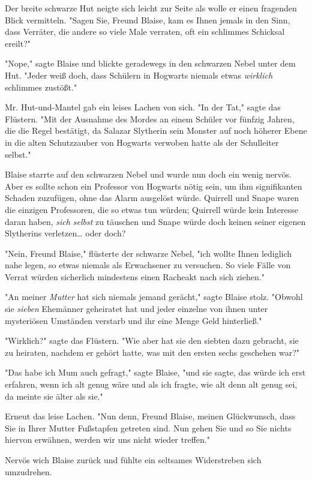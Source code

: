 {Der breite schwarze Hut neigte sich leicht zur Seite als wolle er einen fragenden Blick vermitteln. "Sagen Sie, Freund Blaise, kam es Ihnen jemals in den Sinn, dass Verräter, die andere so viele Male verraten, oft ein schlimmes Schicksal ereilt?"

"Nope," sagte Blaise und blickte geradewegs in den schwarzen Nebel unter dem Hut. "Jeder weiß doch, dass Schülern in Hogwarts niemals etwas \emph{wirklich} schlimmes zustößt."

Mr. Hut-und-Mantel gab ein leises Lachen von sich. "In der Tat," sagte das Flüstern. "Mit der Ausnahme des Mordes an einem Schüler vor fünfzig Jahren, die die Regel bestätigt, da Salazar Slytherin sein Monster auf noch höherer Ebene in die alten Schutzzauber von Hogwarts verwoben hatte als der Schulleiter selbst."

Blaise starrte auf den schwarzen Nebel und wurde nun doch ein wenig nervös. Aber es sollte schon ein Professor von Hogwarts nötig sein, um ihm signifikanten Schaden zuzufügen, ohne das Alarm ausgelöst würde. Quirrell und Snape waren die einzigen Professoren, die so etwas tun würden; Quirrell würde kein Interesse daran haben, \emph{sich selbst} zu täuschen und Snape würde doch keinen seiner eigenen Slytherins verletzen… oder doch?

"Nein, Freund Blaise," flüsterte der schwarze Nebel, "ich wollte Ihnen lediglich nahe legen, so etwas niemals als Erwachsener zu versuchen. So viele Fälle von Verrat würden sicherlich mindestens einen Racheakt nach sich ziehen."

"An meiner \emph{Mutter} hat sich niemals jemand gerächt," sagte Blaise stolz. "Obwohl sie \emph{sieben} Ehemänner geheiratet hat und jeder einzelne von ihnen unter mysteriösen Umständen verstarb und ihr eine Menge Geld hinterließ."

"Wirklich?" sagte das Flüstern. "Wie aber hat sie den siebten dazu gebracht, sie zu heiraten, nachdem er gehört hatte, was mit den ersten sechs geschehen war?"

"Das habe ich Mum auch gefragt," sagte Blaise, "und sie sagte, das würde ich erst erfahren, wenn ich alt genug wäre und als ich fragte, wie alt denn alt genug sei, da meinte sie älter als sie."

Erneut das leise Lachen. "Nun denn, Freund Blaise, meinen Glückwunsch, dass Sie in Ihrer Mutter Fußstapfen getreten sind. Nun gehen Sie und so Sie nichts hiervon erwähnen, werden wir uns nicht wieder treffen."

Nervös wich Blaise zurück und fühlte ein seltsames Widerstreben sich umzudrehen.

}
